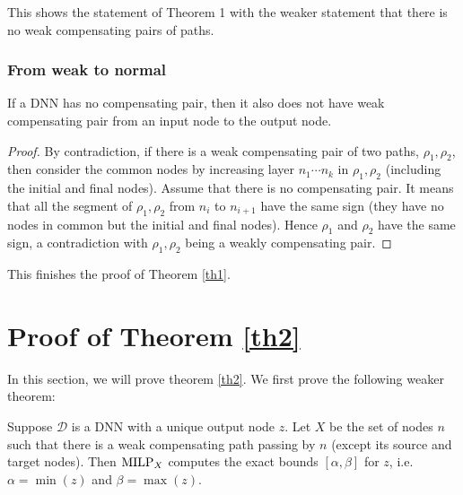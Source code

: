 This shows the statement of Theorem 1 with the weaker statement that there is no weak compensating pairs of paths.

	
	
	\subsubsection*{From weak to normal}
	
	\begin{lemma}
		If a DNN has no compensating pair, then it also does not have weak compensating pair from an input node to the output node.
	\end{lemma}
	
	\begin{proof}
		By contradiction, if there is a weak compensating pair of two paths, $\rho_1,\rho_2$, 
		then consider the common nodes by increasing layer $n_1 \cdots n_k$ in $\rho_1,\rho_2$ (including the initial and final nodes).
		Assume that there is no compensating pair.
		It means that all the segment of $\rho_1,\rho_2$ from $n_i$ to $n_{i+1}$ have the same sign (they have no nodes in common but the initial and final nodes).
		Hence $\rho_1$ and $\rho_2$ have the same sign, a contradiction with $\rho_1,\rho_2$ being a weakly compensating pair. 
	\end{proof}
	
	This finishes the proof of Theorem \ref{th1}.
	
	












	\newpage

	





			
\section{Proof of Theorem \ref{th2}}
			
			In this section, we will prove theorem \ref{th2}. We first prove the following weaker theorem:
			
			\begin{theorem} \label{thm:2}
				
				
				Suppose $\mathcal{D}$ is a DNN with a unique output node $z$.
				Let $X$ be the set of nodes $n$ such that there is a weak compensating path 
				passing by $n$ (except its source and target nodes).
				Then ${\textrm{MILP}}_X$ computes the exact bounds $[\alpha,\beta]$ for $z$,
				i.e. $\alpha=\min(z)$ and $\beta=\max(z)$.
			\end{theorem}
			
